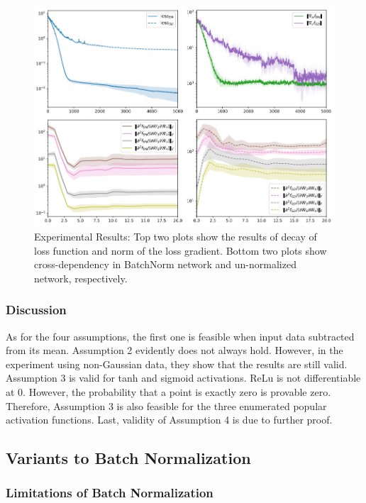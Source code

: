 \documentclass{article}
\begin{document}
\begin{figure}[h]
	\centering
    \includegraphics[scale=0.5]{pics/batchNorm/decoupling_experiment.jpg}
	\caption{Experimental Results: Top two plots show the results of decay of loss function and norm of the loss gradient. Bottom two plots show cross-dependency in BatchNorm network and un-normalized network, respectively.}
	\label{fig:decouplingexperiment}
\end{figure}

\subsubsection{Discussion}

As for the four assumptions, the first one is feasible when input data subtracted from its mean. Assumption 2 evidently does not always hold. However, in the experiment using non-Gaussian data, they show that the results are still valid. Assumption 3 is valid for tanh and sigmoid activations. ReLu is not differentiable at 0. However, the probability that a point is exactly zero is provable zero. Therefore, Assumption 3 is also feasible for the three enumerated popular activation functions. Last, validity of Assumption 4 is due to further proof. 

\subsection{Variants to Batch Normalization}

\subsubsection{Limitations of Batch Normalization}
\end{document}
